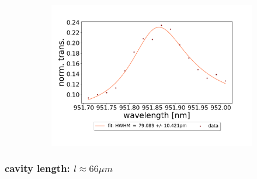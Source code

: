 \begin{figure} \ContinuedFloat
    \centering
    \begin{subfigure}[b]{0.49\textwidth}
        \includegraphics[width=\textwidth]{figures/results/double fano fits/120um_M3:M5_fit_7.pdf}
        \caption{}
        \label{fig:120um_M3:M5_fit_7}
    \end{subfigure}
\end{figure}

\clearpage
\subsubsection*{cavity length: $l \approx 66 \mu m$}

